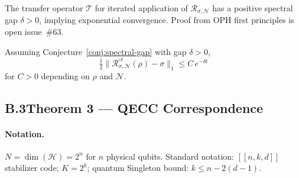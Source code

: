 \begin{conjecture}
\label{conj:spectral-gap}
The transfer operator $\mathcal{T}$ for iterated application of
$\mathcal{R}_{\sigma,\mathcal{N}}$ has a positive spectral gap
$\delta>0$, implying exponential convergence.
Proof from OPH first principles is open issue~\#63.
\end{conjecture}

\begin{theorem}
\label{thm:exp-convergence}
Assuming Conjecture~\ref{conj:spectral-gap} with gap $\delta>0$,
\[
  \tfrac12\bigl\|\mathcal{R}_{\sigma,\mathcal{N}}^{\circ t}(\rho)
  -\sigma\bigr\|_1
  \leq C\,e^{-\delta t}
\]
for $C>0$ depending on $\rho$ and $\mathcal{N}$.
\end{theorem}

\subsection*{B.3\quad Theorem 3 --- QECC Correspondence}

\paragraph{Notation.}
$N=\dim(\mathcal{H})=2^n$ for $n$ physical qubits.
Standard notation: $[[n,k,d]]$ stabilizer code; $K=2^k$; quantum
Singleton bound: $k\leq n-2(d-1)$.

